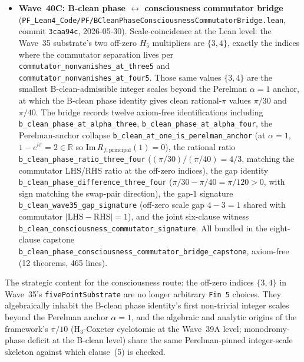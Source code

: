 \begin{remark}
\begin{itemize}
  \item \textbf{Wave~40C: B-clean phase $\leftrightarrow$ consciousness commutator bridge} (\texttt{PF\_Lean4\_Code/PF/BCleanPhaseConsciousnessCommutatorBridge.lean}, commit \texttt{3caa94c}, 2026-05-30). Scale-coincidence at the Lean level: the Wave~35 substrate's two off-zero $H_5$ multipliers are $\{3, 4\}$, exactly the indices where the commutator separation lives per \texttt{commutator\_nonvanishes\_at\_three5} and \texttt{commutator\_nonvanishes\_at\_four5}. Those same values $\{3, 4\}$ are the smallest B-clean-admissible integer scales beyond the Perelman $\alpha = 1$ anchor, at which the B-clean phase identity gives clean rational-$\pi$ values $\pi/30$ and $\pi/40$. The bridge records twelve axiom-free identifications including \texttt{b\_clean\_phase\_at\_alpha\_three}, \texttt{b\_clean\_phase\_at\_alpha\_four}, the Perelman-anchor collapse \texttt{b\_clean\_at\_one\_is\_perelman\_anchor} (at $\alpha = 1$, $1 - e^{i\pi} = 2 \in \mathbb{R}$ so $\mathrm{Im}\, R_{f,\mathrm{principal}}(1) = 0$), the rational ratio \texttt{b\_clean\_phase\_ratio\_three\_four} ($(\pi/30)/(\pi/40) = 4/3$, matching the commutator LHS/RHS ratio at the off-zero indices), the gap identity \texttt{b\_clean\_phase\_difference\_three\_four} ($\pi/30 - \pi/40 = \pi/120 > 0$, with sign matching the swap-pair direction), the gap-$1$ signature \texttt{b\_clean\_wave35\_gap\_signature} (off-zero scale gap $4 - 3 = 1$ shared with commutator $|\mathrm{LHS} - \mathrm{RHS}| = 1$), and the joint six-clause witness \texttt{b\_clean\_consciousness\_commutator\_signature}. All bundled in the eight-clause capstone \texttt{b\_clean\_phase\_consciousness\_commutator\_bridge\_capstone}, axiom-free (12 theorems, 465 lines).
\end{itemize}
The strategic content for the consciousness route: the off-zero indices $\{3, 4\}$ in Wave~35's \texttt{fivePointSubstrate} are no longer arbitrary \texttt{Fin 5} choices. They algebraically inhabit the B-clean phase identity's first non-trivial integer scales beyond the Perelman anchor $\alpha = 1$, and the algebraic and analytic origins of the framework's $\pi/10$ (H$_3$-Coxeter cyclotomic at the Wave~39A level; monodromy-phase deficit at the B-clean level) share the same Perelman-pinned integer-scale skeleton against which clause~(5) is checked.


\end{remark}

